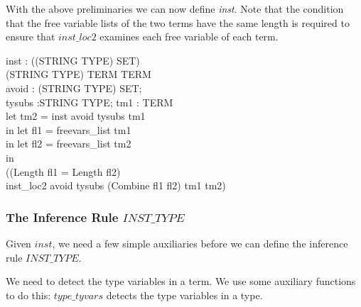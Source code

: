 \documentclass[a4paper,11pt,titlepage]{article}
\begin{document}
\begin{titlepage}
With the above preliminaries we can now define {\it inst}.
Note that the condition that the free variable lists of
the two terms have the same length is required to ensure
that $inst\_loc2$ examines each free variable of each
term.

\begin{HOLConst}
\+	\PrNL{}inst\PrNN{} : ((STRING \MMM{\times} TYPE) SET) \MMM{\rightarrow}\\
\+		(STRING \MMM{\rightarrow} TYPE) \MMM{\rightarrow} TERM \MMM{\rightarrow} TERM\\
\PrPH{}
\+	\MMM{\forall}avoid : (STRING \MMM{\times} TYPE) SET;\\
\+	tysubs :STRING \MMM{\rightarrow} TYPE; tm1 : TERM\MMM{\bullet}\\
\+	let tm2 = inst avoid tysubs tm1\\
\+	in let fl1 = freevars\_list tm1\\
\+	in let fl2 = freevars\_list tm2\\
\+	in\\
\+		((Length fl1 = Length fl2)\\
\+	\MMM{\land}	inst\_loc2 avoid tysubs (Combine fl1 fl2) tm1 tm2)\\
\end{HOLConst}

\subsubsection{The Inference Rule $INST\_TYPE$}

Given $inst$, we need a few simple auxiliaries before
we can define the inference rule $INST\_TYPE$.

We need to detect the type variables in a term.
We use some auxiliary functions to
do this: $type\_tyvars$ detects the type variables in
a type.


\end{titlepage}
\end{document}
